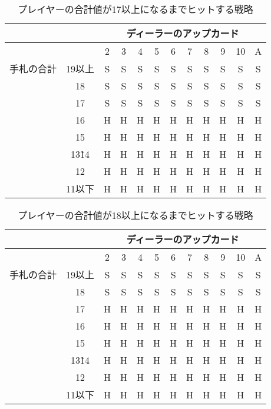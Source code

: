 \begin{table}[htbp]
  \centering
  \caption{プレイヤーの合計値が17以上になるまでヒットする戦略\label{hitleq17}}
  \begin{tabular}{|c|c|c|c|c|c|c|c|c|c|c|c|}
    \hline
    \multicolumn{2}{|c|}{} & \multicolumn{10}{|c|}{ディーラーのアップカード} \\ \hline
    \multicolumn{2}{|c|}{} & 2 & 3 & 4 & 5 & 6 & 7 & 8 & 9 & 10 & A \\ \hline
    手札の合計 & 19以上 & S & S & S & S & S & S & S & S & S & S \\ \cline{3-12}
              & 18 & S & S & S & S & S & S & S & S & S & S \\ \cline{3-12}
              & 17 & S & S & S & S & S & S & S & S & S & S \\ \cline{3-12}
              & 16 & H & H & H & H & H & H & H & H & H & H \\ \cline{3-12}
              & 15 & H & H & H & H & H & H & H & H & H & H \\ \cline{3-12}
              & 13\~ 14 & H & H & H & H & H & H & H & H & H & H \\ \cline{3-12}
              & 12 & H & H & H & H & H & H & H & H & H & H \\ \cline{3-12}
              & 11以下 & H & H & H & H & H & H & H & H & H & H \\ \hline
  \end{tabular}
\end{table}

\begin{table}[htbp]
  \centering
  \caption{プレイヤーの合計値が18以上になるまでヒットする戦略\label{hitleq18}}
  \begin{tabular}{|c|c|c|c|c|c|c|c|c|c|c|c|}
    \hline
    \multicolumn{2}{|c|}{} & \multicolumn{10}{|c|}{ディーラーのアップカード} \\ \hline
    \multicolumn{2}{|c|}{} & 2 & 3 & 4 & 5 & 6 & 7 & 8 & 9 & 10 & A \\ \hline
    手札の合計 & 19以上 & S & S & S & S & S & S & S & S & S & S \\ \cline{3-12}
              & 18 & S & S & S & S & S & S & S & S & S & S \\ \cline{3-12}
              & 17 & H & H & H & H & H & H & H & H & H & H \\ \cline{3-12}
              & 16 & H & H & H & H & H & H & H & H & H & H \\ \cline{3-12}
              & 15 & H & H & H & H & H & H & H & H & H & H \\ \cline{3-12}
              & 13\~ 14 & H & H & H & H & H & H & H & H & H & H \\ \cline{3-12}
              & 12 & H & H & H & H & H & H & H & H & H & H \\ \cline{3-12}
              & 11以下 & H & H & H & H & H & H & H & H & H & H \\ \hline
  \end{tabular}
\end{table}
\newpage

